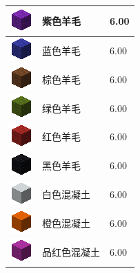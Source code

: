 \documentclass[UTF8]{ctexart}
\begin{document}
\begin{longtable}[]{|p{1cm}|p{8cm}|p{1.5cm}|}
	\hline
	\includegraphics{.workspace/icons/minecraft/minecraft__wool__10.png} & 紫色羊毛 &6.00\\
	\hline
	\includegraphics{.workspace/icons/minecraft/minecraft__wool__11.png} & 蓝色羊毛 &6.00\\
	\hline
	\includegraphics{.workspace/icons/minecraft/minecraft__wool__12.png} & 棕色羊毛 &6.00\\
	\hline
	\includegraphics{.workspace/icons/minecraft/minecraft__wool__13.png} & 绿色羊毛 &6.00\\
	\hline
	\includegraphics{.workspace/icons/minecraft/minecraft__wool__14.png} & 红色羊毛 &6.00\\
	\hline
	\includegraphics{.workspace/icons/minecraft/minecraft__wool__15.png} & 黑色羊毛 &6.00\\
	\hline
	\includegraphics{.workspace/icons/minecraft/minecraft__concrete__0.png} & 白色混凝土 &6.00\\
	\hline
	\includegraphics{.workspace/icons/minecraft/minecraft__concrete__1.png} & 橙色混凝土 &6.00\\
	\hline
	\includegraphics{.workspace/icons/minecraft/minecraft__concrete__2.png} & 品红色混凝土 &6.00\\

\end{longtable}
\end{document}
